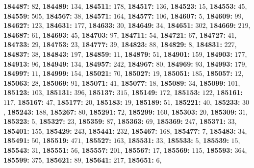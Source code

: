 \textsf{\bfseries 184487:} $82$, \textsf{\bfseries 184489:} $134$, \textsf{\bfseries 184511:} $178$, \textsf{\bfseries 184517:} $136$, \textsf{\bfseries 184523:} $15$, \textsf{\bfseries 184553:} $45$, \textsf{\bfseries 184559:} $505$, \textsf{\bfseries 184567:} $38$, \textsf{\bfseries 184571:} $164$, \textsf{\bfseries 184577:} $106$, \textsf{\bfseries 184607:} $5$, \textsf{\bfseries 184609:} $99$, \textsf{\bfseries 184627:} $123$, \textsf{\bfseries 184631:} $177$, \textsf{\bfseries 184633:} $30$, \textsf{\bfseries 184649:} $34$, \textsf{\bfseries 184651:} $302$, \textsf{\bfseries 184669:} $219$, \textsf{\bfseries 184687:} $61$, \textsf{\bfseries 184693:} $45$, \textsf{\bfseries 184703:} $97$, \textsf{\bfseries 184711:} $54$, \textsf{\bfseries 184721:} $67$, \textsf{\bfseries 184727:} $41$, \textsf{\bfseries 184733:} $29$, \textsf{\bfseries 184753:} $23$, \textsf{\bfseries 184777:} $39$, \textsf{\bfseries 184823:} $88$, \textsf{\bfseries 184829:} $8$, \textsf{\bfseries 184831:} $227$, \textsf{\bfseries 184837:} $38$, \textsf{\bfseries 184843:} $197$, \textsf{\bfseries 184859:} $11$, \textsf{\bfseries 184879:} $51$, \textsf{\bfseries 184901:} $159$, \textsf{\bfseries 184903:} $177$, \textsf{\bfseries 184913:} $96$, \textsf{\bfseries 184949:} $134$, \textsf{\bfseries 184957:} $242$, \textsf{\bfseries 184967:} $80$, \textsf{\bfseries 184969:} $93$, \textsf{\bfseries 184993:} $179$, \textsf{\bfseries 184997:} $11$, \textsf{\bfseries 184999:} $154$, \textsf{\bfseries 185021:} $70$, \textsf{\bfseries 185027:} $19$, \textsf{\bfseries 185051:} $185$, \textsf{\bfseries 185057:} $12$, \textsf{\bfseries 185063:} $28$, \textsf{\bfseries 185069:} $91$, \textsf{\bfseries 185071:} $41$, \textsf{\bfseries 185077:} $18$, \textsf{\bfseries 185089:} $34$, \textsf{\bfseries 185099:} $101$, \textsf{\bfseries 185123:} $103$, \textsf{\bfseries 185131:} $396$, \textsf{\bfseries 185137:} $315$, \textsf{\bfseries 185149:} $172$, \textsf{\bfseries 185153:} $122$, \textsf{\bfseries 185161:} $117$, \textsf{\bfseries 185167:} $47$, \textsf{\bfseries 185177:} $20$, \textsf{\bfseries 185183:} $19$, \textsf{\bfseries 185189:} $51$, \textsf{\bfseries 185221:} $40$, \textsf{\bfseries 185233:} $30$, \textsf{\bfseries 185243:} $188$, \textsf{\bfseries 185267:} $80$, \textsf{\bfseries 185291:} $72$, \textsf{\bfseries 185299:} $160$, \textsf{\bfseries 185303:} $20$, \textsf{\bfseries 185309:} $31$, \textsf{\bfseries 185323:} $5$, \textsf{\bfseries 185327:} $23$, \textsf{\bfseries 185359:} $87$, \textsf{\bfseries 185363:} $69$, \textsf{\bfseries 185369:} $247$, \textsf{\bfseries 185371:} $33$, \textsf{\bfseries 185401:} $155$, \textsf{\bfseries 185429:} $243$, \textsf{\bfseries 185441:} $232$, \textsf{\bfseries 185467:} $168$, \textsf{\bfseries 185477:} $7$, \textsf{\bfseries 185483:} $34$, \textsf{\bfseries 185491:} $50$, \textsf{\bfseries 185519:} $471$, \textsf{\bfseries 185527:} $163$, \textsf{\bfseries 185531:} $33$, \textsf{\bfseries 185533:} $5$, \textsf{\bfseries 185539:} $15$, \textsf{\bfseries 185543:} $31$, \textsf{\bfseries 185551:} $56$, \textsf{\bfseries 185557:} $201$, \textsf{\bfseries 185567:} $17$, \textsf{\bfseries 185569:} $115$, \textsf{\bfseries 185593:} $364$, \textsf{\bfseries 185599:} $375$, \textsf{\bfseries 185621:} $89$, \textsf{\bfseries 185641:} $217$, \textsf{\bfseries 185651:} $6$, 
